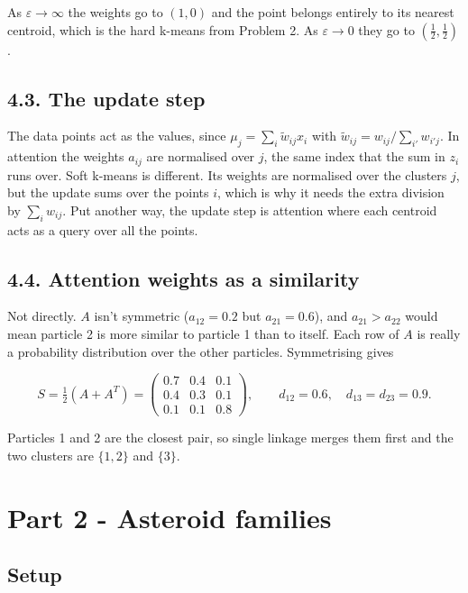 \documentclass[11pt,a4paper]{article}
\begin{document}
As $\varepsilon\to\infty$ the weights go to $(1,0)$ and the point belongs entirely to its nearest centroid, which is the hard k-means from Problem 2. As $\varepsilon\to0$ they go to $(\tfrac12,\tfrac12)$.

\subsection*{4.3. The update step}

The data points act as the values, since $\mu_j=\sum_i\tilde w_{ij}x_i$ with $\tilde w_{ij}=w_{ij}/\sum_{i'}w_{i'j}$. In attention the weights $a_{ij}$ are normalised over $j$, the same index that the sum in $z_i$ runs over. Soft k-means is different. Its weights are normalised over the clusters $j$, but the update sums over the points $i$, which is why it needs the extra division by $\sum_i w_{ij}$. Put another way, the update step is attention where each centroid acts as a query over all the points.

\subsection*{4.4. Attention weights as a similarity}

Not directly. $A$ isn't symmetric ($a_{12}=0.2$ but $a_{21}=0.6$), and $a_{21}>a_{22}$ would mean particle 2 is more similar to particle 1 than to itself. Each row of $A$ is really a probability distribution over the other particles. Symmetrising gives

\[
S=\tfrac12(A+A^T)=\begin{pmatrix}0.7&0.4&0.1\\0.4&0.3&0.1\\0.1&0.1&0.8\end{pmatrix},\qquad d_{12}=0.6,\quad d_{13}=d_{23}=0.9.
\]

Particles 1 and 2 are the closest pair, so single linkage merges them first and the two clusters are $\{1,2\}$ and $\{3\}$.

\section*{Part 2 - Asteroid families}

\subsection*{Setup}
\end{document}
